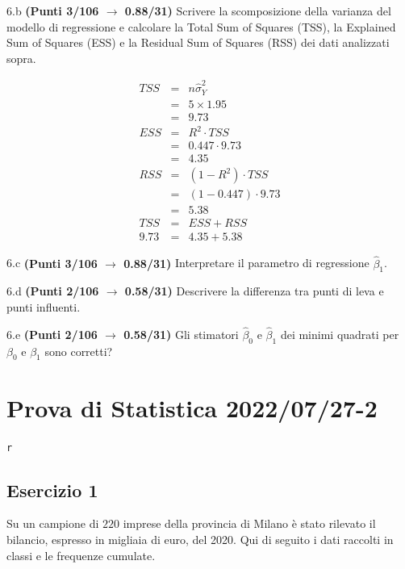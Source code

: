 \documentclass[
  11pt,
]{book}
\theoremstyle{mytheoremstyle}
\theoremstyle{mydefstyle}
\newenvironment{sol}
  {
  \begin{tcolorbox}[enhanced,breakable,arc=0.1mm,boxrule=1pt,colback=white,colframe=iblue,
  title=\bf \fontfamily{lmss}\selectfont \hspace{.5 cm} Soluzione,drop fuzzy shadow]

}{
\end{tcolorbox}
  }
\begin{document}
6.b \textbf{(Punti 3/106 \(\rightarrow\) 0.88/31)} Scrivere la scomposizione della varianza del modello di regressione
e calcolare la Total Sum of Squares (TSS), la Explained Sum of Squares (ESS) e la Residual Sum of Squares (RSS) dei dati analizzati sopra.

\begin{sol}
\begin{eqnarray*}
   TSS &=& n\hat\sigma^2_Y\\
      &=& 5 \times 1.95 \\
      &=&  9.73 \\
   ESS &=& R^2\cdot TSS\\
      &=&  0.447 \cdot 9.73 \\
      &=& 4.35 \\
   RSS &=& (1-R^2)\cdot TSS\\
      &=& (1- 0.447 )\cdot 9.73 \\
      &=&  5.38 \\
   TSS &=& ESS+RSS \\ 9.73  &=&  4.35 + 5.38 
  \end{eqnarray*}

\end{sol}

6.c \textbf{(Punti 3/106 \(\rightarrow\) 0.88/31)} Interpretare il parametro di regressione \(\hat\beta_1\).

6.d \textbf{(Punti 2/106 \(\rightarrow\) 0.58/31)} Descrivere la differenza tra punti di leva e punti influenti.

6.e \textbf{(Punti 2/106 \(\rightarrow\) 0.58/31)} Gli stimatori \(\hat\beta_0\) e \(\hat\beta_1\) dei minimi
quadrati per \(\beta_0\) e \(\beta_1\) sono corretti?

\section{Prova di Statistica 2022/07/27-2}\label{prova-di-statistica-20220727-2}

\texttt{r}

\subsection{Esercizio 1}\label{esercizio-1-18}

Su un campione di \(220\) imprese della provincia di Milano è stato
rilevato il bilancio, espresso in migliaia di euro, del 2020. Qui di seguito i dati raccolti in classi
e le frequenze cumulate.
\end{document}
